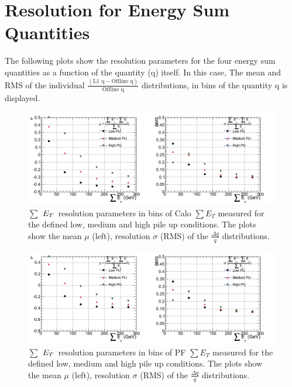 \newpage
\section{Resolution for Energy Sum Quantities}
\label{app:jetenergysums}

The following plots show the resolution parameters for the four energy sum quantities as a function of the quantity (q) itself. In this case, The mean and RMS of the individual $\frac{(\text{L1 q} -  \text{Offline q})}{\text{Offline q}}$ distributions, in bins of the quantity q is displayed. 

\begin{figure}[h!]
  \vspace{20pt}
        \centering
        \includegraphics[width=1.0\textwidth]{plots/res_CaloSumET_summary.png}
        \caption{$\sum$ $E_{T}$~resolution parameters in bins of Calo $\sum E_{T}$  measured for the defined low, medium and high pile up conditions. The plots show the mean $\mu$ (left), resolution $\sigma$ (RMS) of the $\frac{\Delta q}{q}$ distributions.}
        \label{fig:caloetresultspu}
\end{figure}
\begin{figure}[h!]
  \vspace{20pt}
  \centering
        \includegraphics[width=1.0\textwidth]{plots/res_pfSumET_summary.png}
        \caption{$\sum$ $E_{T}$~resolution parameters in bins of PF $\sum E_{T}$  measured for the defined low, medium and high pile up conditions. The plots show the mean $\mu$ (left), resolution $\sigma$ (RMS) of the $\frac{\Delta q}{q}$ distributions.}
        \label{fig:pfetresultspu}
\end{figure}

